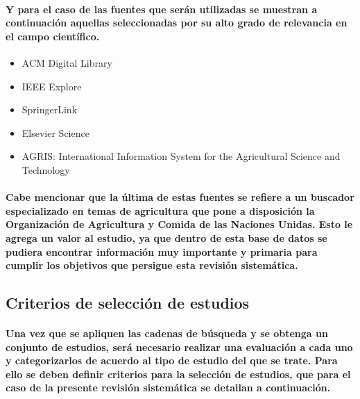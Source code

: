 \documentclass[10pt, twocolumn]{article}
\begin{document}
\paragraph{Y para el caso de las fuentes que serán utilizadas se muestran a continuación aquellas seleccionadas por su alto grado de relevancia en el campo científico.}
\begin{itemize}
	\item{ACM Digital Library}
	\item{IEEE Explore}
	\item{SpringerLink}
	\item{Elsevier Science}
	\item{AGRIS: International Information System for the Agricultural Science and Technology}
\end{itemize}
\paragraph{Cabe mencionar que la última de estas fuentes se refiere a un buscador especializado en temas de agricultura que pone a disposición la Organización de Agricultura y Comida de las Naciones Unidas. Esto le agrega un valor al estudio, ya que dentro de esta base de datos se pudiera encontrar información muy importante y primaria para cumplir los objetivos que persigue esta revisión sistemática.}

\subsection{Criterios de selección de estudios}
\paragraph{Una vez que se apliquen las cadenas de búsqueda y se obtenga un conjunto de estudios, será necesario realizar una evaluación a cada uno y categorizarlos de acuerdo al tipo de estudio del que se trate. Para ello se deben definir criterios para la selección de estudios, que para el caso de la presente revisión sistemática se detallan a continuación.}
\end{document}
